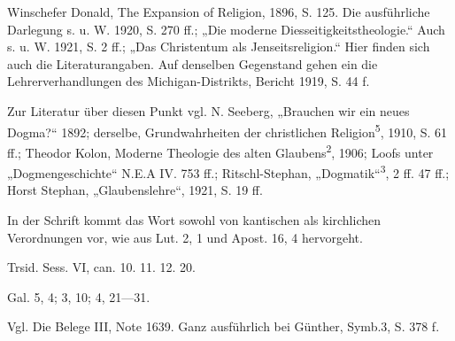 \begingroup\footnotesize
\itemize
    \item[\textsuperscript{394}] Winschefer Donald, The Expansion of Religion, 1896, S. 125. Die ausführliche Darlegung s. u. W. 1920, S. 270 ff.; „Die moderne Diesseitigkeitstheologie.“ Auch s. u. W. 1921, S. 2 ff.; „Das Christentum als Jenseitsreligion.“ Hier finden sich auch die Literaturangaben. Auf denselben Gegenstand gehen ein die Lehrerverhandlungen des Michigan-Distrikts, Bericht 1919, S. 44 f.
    \item[\textsuperscript{395}] Zur Literatur über diesen Punkt vgl. N. Seeberg, „Brauchen wir ein neues Dogma?“ 1892; derselbe, Grundwahrheiten der christlichen Religion\textsuperscript{5}, 1910, S. 61 ff.; Theodor Kolon, Moderne Theologie des alten Glaubens\textsuperscript{2}, 1906; Loofs unter „Dogmengeschichte“ N.E.A IV. 753 ff.; Ritschl-Stephan, „Dogmatik“\textsuperscript{3}, 2 ff. 47 ff.; Horst Stephan, „Glaubenslehre“, 1921, S. 19 ff.
    \item[\textsuperscript{396}] In der Schrift kommt das Wort sowohl von kantischen als kirchlichen Verordnungen vor, wie aus Lut. 2, 1 und Apost. 16, 4 hervorgeht.
    \item[\textsuperscript{397}] Trsid. Sess. VI, can. 10. 11. 12. 20.
    \item[\textsuperscript{398}] Gal. 5, 4; 3, 10; 4, 21—31.
    \item[\textsuperscript{399}] Vgl. Die Belege III, Note 1639. Ganz ausführlich bei Günther, Symb.3, S. 378 f.
\endgroup